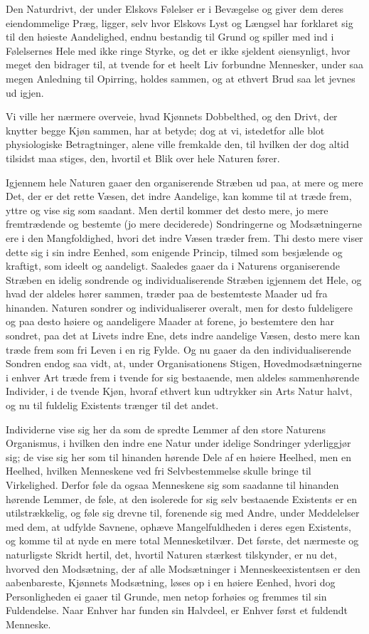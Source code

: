 \documentclass[12pt,a4paper]{book}
\newcommand{\apage}[1]{\marginnote{\footnotesize\textit{[#1]}}}
\begin{document}
Den Naturdrivt, der under Elskovs Følelser er i Bevægelse og giver dem
deres eiendommelige Præg, ligger, selv hvor Elskovs Lyst og Længsel har
forklaret sig til den høieste Aandelighed, endnu bestandig til Grund og
spiller med ind i Følelsernes Hele med ikke ringe Styrke, og det er
ikke sjeldent øiensynligt, hvor meget den bidrager til, at tvende for
et heelt Liv forbundne Mennesker, under saa megen Anledning til
Opirring, holdes sammen, og at ethvert Brud saa let jevnes ud igjen.

Vi ville her nærmere overveie, hvad Kjønnets Dobbelthed, og den Drivt,
der knytter begge Kjøn sammen, har at betyde; dog at vi, istedetfor alle
blot physiologiske Betragtninger, alene ville fremkalde den, til hvilken
der dog altid tilsidst maa stiges, den, hvortil et Blik over hele
Naturen fører.

Igjennem hele Naturen gaaer den organiserende Stræben ud paa, at mere
og mere Det, der er det \apage{40} rette Væsen, det indre Aandelige, kan komme til
at træde frem, yttre og vise sig som saadant. Men dertil kommer det
desto mere, jo mere fremtrædende og bestemte (jo mere deciderede)
Sondringerne og Modsætningerne ere i den Mangfoldighed, hvori det indre
Væsen træder frem. Thi desto mere viser dette sig i sin indre Eenhed,
som enigende Princip, tilmed som besjælende og kraftigt, som ideelt og
aandeligt. Saaledes gaaer da i Naturens organiserende Stræben en idelig
sondrende og individualiserende Stræben igjennem det Hele, og hvad der
aldeles hører sammen, træder paa de bestemteste Maader ud fra hinanden.
Naturen sondrer og individualiserer overalt, men for desto fuldeligere
og paa desto høiere og aandeligere Maader at forene, jo bestemtere den
har sondret, paa det at Livets indre Ene, dets indre aandelige Væsen,
desto mere kan træde frem som fri Leven i en rig Fylde. Og nu gaaer da
den individualiserende Sondren endog saa vidt, at, under Organisationens
Stigen, Hovedmodsætningerne i enhver Art træde frem i tvende for sig
bestaaende, men aldeles sammenhørende Individer, i de tvende Kjøn,
hvoraf ethvert kun udtrykker sin Arts Natur halvt, og nu til fuldelig
Existents trænger til det andet.

Individerne vise sig her da som de
spredte Lemmer af den store Naturens Organismus, i hvilken den indre
ene Natur under idelige Sondringer yderliggjør sig; de vise sig her som
til hinanden hørende Dele af \apage{41} en høiere Heelhed, men en Heelhed, hvilken
Menneskene ved fri Selvbestemmelse skulle bringe til Virkelighed.
Derfor føle da ogsaa Menneskene sig som saadanne til hinanden hørende
Lemmer, de føle, at den isolerede for sig selv bestaaende Existents er
en utilstrækkelig, og føle sig drevne til, forenende sig med Andre,
under Meddelelser med dem, at udfylde Savnene, ophæve Mangelfuldheden i
deres egen Existents, og komme til at nyde en mere total
Mennesketilvær. Det første, det nærmeste og naturligste Skridt hertil,
det, hvortil Naturen stærkest tilskynder, er nu det, hvorved den
Modsætning, der af alle Modsætninger i Menneskeexistentsen er den
aabenbareste, Kjønnets Modsætning, løses op i en høiere Eenhed, hvori
dog Personligheden ei gaaer til Grunde, men netop forhøies og fremmes
til sin Fuldendelse. Naar Enhver har funden sin Halvdeel, er Enhver
først et fuldendt Menneske.
\end{document}
